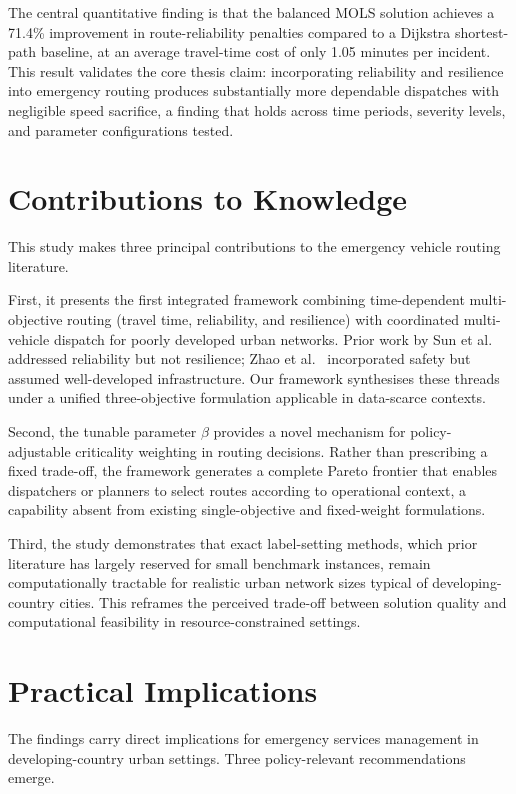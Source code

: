 \documentclass[paper=A4, 12pt, mathscr]{report}
\begin{document}
	The central quantitative finding is that the balanced MOLS solution achieves a 71.4\% improvement in route-reliability penalties compared to a Dijkstra shortest-path baseline, at an average travel-time cost of only 1.05 minutes per incident. This result validates the core thesis claim: incorporating reliability and resilience into emergency routing produces substantially more dependable dispatches with negligible speed sacrifice, a finding that holds across time periods, severity levels, and parameter configurations tested.
	
	\section{Contributions to Knowledge}
	
	This study makes three principal contributions to the emergency vehicle routing literature.
	
	First, it presents the first integrated framework combining time-dependent multi-objective routing (travel time, reliability, and resilience) with coordinated multi-vehicle dispatch for poorly developed urban networks. Prior work by Sun et al.\ \cite{6} addressed reliability but not resilience; Zhao et al.\ \cite{16} incorporated safety but assumed well-developed infrastructure. Our framework synthesises these threads under a unified three-objective formulation applicable in data-scarce contexts.
	
	Second, the tunable parameter $\beta$ provides a novel mechanism for policy-adjustable criticality weighting in routing decisions. Rather than prescribing a fixed trade-off, the framework generates a complete Pareto frontier that enables dispatchers or planners to select routes according to operational context,  a capability absent from existing single-objective and fixed-weight formulations.
	
	Third, the study demonstrates that exact label-setting methods, which prior literature has largely reserved for small benchmark instances, remain computationally tractable for realistic urban network sizes typical of developing-country cities. This reframes the perceived trade-off between solution quality and computational feasibility in resource-constrained settings.
	
	\section{Practical Implications}
	
	The findings carry direct implications for emergency services management in developing-country urban settings. Three policy-relevant recommendations emerge.
	
\end{document}
